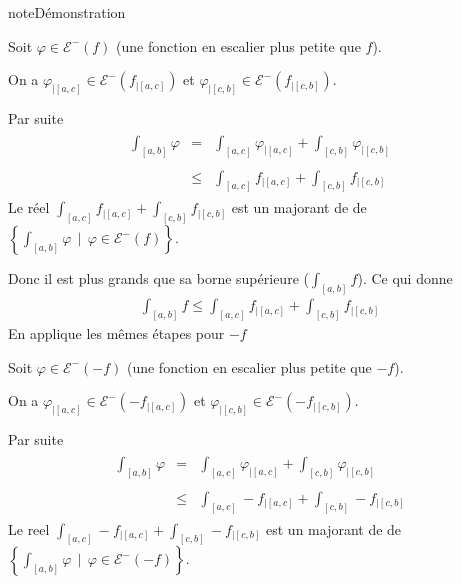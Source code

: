 \documentclass[letterpaper,10pt,french]{sphinxmanual}
\begin{document}
\begin{sphinxadmonition}{note}{Démonstration}

\sphinxAtStartPar
Soit \(\varphi \in \mathcal E^-(f)\) (une fonction en escalier plus petite que \(f\)).

\sphinxAtStartPar
On a \(\varphi_{|[a, c]} \in \mathcal E^-(f_{|[a, c]})\) et \(\varphi_{|[c, b]} \in \mathcal E^-(f_{|[c, b]})\).

\sphinxAtStartPar
Par suite
\begin{equation*}
\begin{split}
\begin{aligned}
\int_{[a, b]}\varphi &=& \int_{[a, c]} \varphi_{|[a, c]} + \int_{[c, b]} \varphi_{|[c, b]} \\ \\
&\leq& \int_{[a, c]} f_{|[a, c]} + \int_{[c, b]} f_{|[c, b]}
\end{aligned}
\end{split}
\end{equation*}
\sphinxAtStartPar
Le réel \(\int_{[a, c]} f_{|[a, c]} + \int_{[c, b]} f_{|[c, b]}\) est un majorant de de \(\left\{\int_{[a, b]}\varphi ~~|~~ \varphi \in \mathcal E^-(f) \right\}\).

\sphinxAtStartPar
Donc il est plus grands que sa borne supérieure (\(\int_{[a, b]} f\)).
Ce qui donne
\begin{equation*}
\begin{split}
\int_{[a, b]} f \leq \int_{[a, c]} f_{|[a, c]} + \int_{[c, b]} f_{|[c, b]}
\end{split}
\end{equation*}
\sphinxAtStartPar
En applique les mêmes étapes pour \(-f\)

\sphinxAtStartPar
Soit \(\varphi \in \mathcal E^-(-f)\) (une fonction en escalier plus petite que \(-f\)).

\sphinxAtStartPar
On a \(\varphi_{|[a, c]} \in \mathcal E^-(-f_{|[a, c]})\) et \(\varphi_{|[c, b]} \in \mathcal E^-(-f_{|[c, b]})\).

\sphinxAtStartPar
Par suite
\begin{equation*}
\begin{split}
\begin{aligned}
\int_{[a, b]}\varphi &=& \int_{[a, c]} \varphi_{|[a, c]} + \int_{[c, b]} \varphi_{|[c, b]} \\ \\
&\leq& \int_{[a, c]} -f_{|[a, c]} + \int_{[c, b]} -f_{|[c, b]}
\end{aligned}
\end{split}
\end{equation*}
\sphinxAtStartPar
Le reel \(\int_{[a, c]} -f_{|[a, c]} + \int_{[c, b]} -f_{|[c, b]}\) est un majorant de de \(\left\{\int_{[a, b]}\varphi ~~|~~ \varphi \in \mathcal E^-(-f) \right\}\).


\end{sphinxadmonition}
\end{document}
